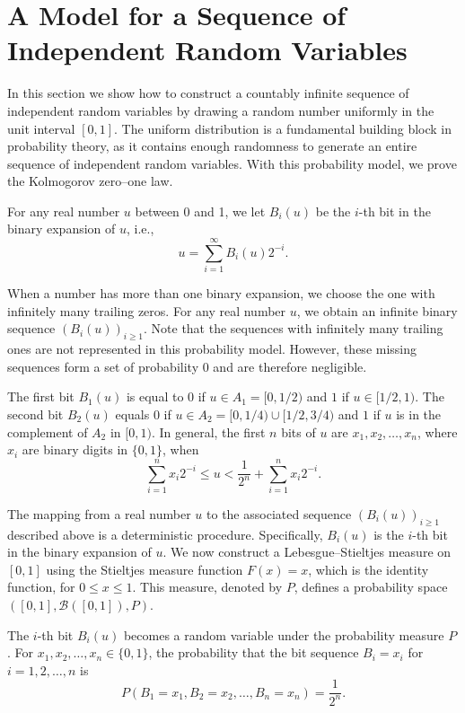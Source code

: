 \section{A Model for a Sequence of Independent Random Variables}

In this section we show how to construct a countably infinite sequence of independent random variables by drawing a random number uniformly in the unit interval $[0,1]$. The uniform distribution is a fundamental building block in probability theory, as it contains enough randomness to generate an entire sequence of independent random variables. With this probability model, we prove the Kolmogorov zero--one law.

For any real number $u$ between 0 and 1, we let $B_i(u)$ be the $i$-th bit in the binary expansion of $u$, i.e.,
\[
u = \sum_{i=1}^{\infty} B_i(u) 2^{-i}.
\]

When a number has more than one binary expansion, we choose the one with infinitely many trailing zeros. For any real number $u$, we obtain an infinite binary sequence $(B_i(u))_{i\ge 1}$. Note that the sequences with infinitely many trailing ones are not represented in this probability model. However, these missing sequences form a set of probability $0$ and are therefore negligible.

The first bit $B_1(u)$ is equal to $0$ if $u \in A_1 = [0,1/2)$ and $1$ if $u \in [1/2,1)$. The second bit $B_2(u)$ equals $0$ if $u \in A_2 = [0,1/4)\cup [1/2,3/4)$ and $1$ if $u$ is in the complement of $A_2$ in $[0,1)$. In general, the first $n$ bits of $u$ are $x_1, x_2, \dots, x_n$, where $x_i$ are binary digits in $\{0,1\}$, when
\[
\sum_{i=1}^{n} x_i 2^{-i} \le u < \frac{1}{2^n} + \sum_{i=1}^{n} x_i 2^{-i}.
\tag{5.5}
\]

The mapping from a real number $u$ to the associated sequence $(B_i(u))_{i\ge 1}$ described above is a deterministic procedure. Specifically, $B_i(u)$ is the $i$-th bit in the binary expansion of $u$. We now construct a Lebesgue--Stieltjes measure on $[0,1]$ using the Stieltjes measure function $F(x)=x$, which is the identity function, for $0\le x\le 1$. This measure, denoted by $P$, defines a probability space $([0,1], \mathcal{B}([0,1]), P)$.

The $i$-th bit $B_i(u)$ becomes a random variable under the probability measure $P$. For $x_1,x_2,\dots,x_n \in \{0,1\}$, the probability that the bit sequence $B_i=x_i$ for $i=1,2,\dots,n$ is
\[
P(B_1 = x_1, B_2 = x_2, \dots, B_n = x_n) = \frac{1}{2^n}.
\tag{5.6}
\]

